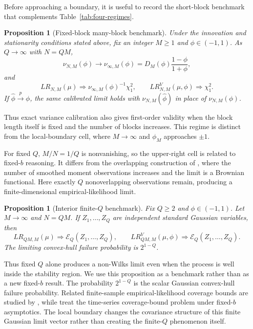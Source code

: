 \documentclass[12pt]{article}
\newtheorem{Proposition}[Theorem]{Proposition}
\theoremstyle{remark}
\begin{document}
Before approaching a boundary, it is useful to record the short-block benchmark that complements Table~\ref{tab:four-regimes}.

\begin{Proposition}[Fixed-block many-block benchmark]
\label{prop:fixedM-manyQ}
Under the innovation and stationarity conditions stated above, fix an integer $M\ge1$ and $\phi\in(-1,1)$. As $Q\to\infty$ with $N=QM$,
\[
\nu_{N,M}(\phi)\longrightarrow
\nu_{\infty,M}(\phi)
=
D_M(\phi)\frac{1-\phi}{1+\phi},
\]
and
\[
LR_{N,M}(\mu)\Rightarrow
\nu_{\infty,M}(\phi)^{-1}\chi_1^2,
\qquad
LR^V_{N,M}(\mu,\phi)\Rightarrow\chi_1^2.
\]
If $\widehat\phi\xrightarrow{p}\phi$, the same calibrated limit holds with $\nu_{N,M}(\widehat\phi)$ in place of $\nu_{N,M}(\phi)$.
\end{Proposition}

Thus exact variance calibration also gives first-order validity when the block length itself is fixed and the number of blocks increases. This regime is distinct from the local-boundary cell, where $M\to\infty$ and $\phi_M$ approaches $\pm1$.

For fixed $Q$, $M/N=1/Q$ is nonvanishing, so the upper-right cell is related to fixed-$b$ reasoning. It differs from the overlapping construction of \citet{Zhang.Shao:2014}, where the number of smoothed moment observations increases and the limit is a Brownian functional. Here exactly $Q$ nonoverlapping observations remain, producing a finite-dimensional empirical-likelihood limit.

\begin{Proposition}[Interior finite-$Q$ benchmark]
\label{prop:fixedQ-interior}
Fix $Q\ge2$ and $\phi\in(-1,1)$. Let $M\to\infty$ and $N=QM$. If $Z_1,\ldots,Z_Q$ are independent standard Gaussian variables, then
\begin{equation}
LR_{QM,M}(\mu)\Rightarrow \mathcal E_Q(Z_1,\ldots,Z_Q),
\qquad
LR^V_{QM,M}(\mu,\phi)\Rightarrow \mathcal E_Q(Z_1,\ldots,Z_Q).
\label{eq:interior-fixedQ-law}
\end{equation}
The limiting convex-hull failure probability is $2^{1-Q}$.
\end{Proposition}

Thus fixed $Q$ alone produces a non-Wilks limit even when the process is well inside the stability region. We use this proposition as a benchmark rather than as a new fixed-$b$ result. The probability $2^{1-Q}$ is the scalar Gaussian convex-hull failure probability. Related finite-sample empirical-likelihood coverage bounds are studied by \citet{Tsao:2004}, while \citet{Zhang.Shao:2016} treat the time-series coverage-bound problem under fixed-$b$ asymptotics. The local boundary changes the covariance structure of this finite Gaussian limit vector rather than creating the finite-$Q$ phenomenon itself.
\end{document}
